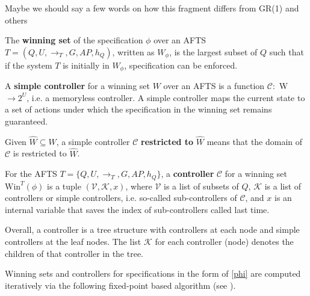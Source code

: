 {\color{blue}Maybe we should say a few words on how this fragment differs from GR(1) and others}

\begin{definition}
	The \textbf{winning set} of the specification $ \phi $ over an AFTS $ T = (Q, U, \rightarrow_T, G, AP, h_Q) $, written as $ W_{\phi} $, is the largest subset of $ Q $ such that if the system $ T $ is initially in $ W_{\phi} $, specification can be enforced.
\end{definition}

\begin{definition}
	A \textbf{simple controller} for a winning set $ W $ over an AFTS is a function $ \mathcal{C}: $ W $ \rightarrow 2^U $, i.e. a memoryless controller. A simple controller maps the current state to a set of actions under which the specification in the winning set remains guaranteed.
	\label{def:simp}
\end{definition}

Given $\widehat{W} \subseteq W $, a simple controller $ \mathcal{C} $ \textbf{restricted to} $ \widehat{W} $ means that the domain of $ \mathcal{C} $ is restricted to $\widehat{W}$.

\begin{definition}
	For the AFTS $ T=\{Q,U,\rightarrow_T,G,AP,h_Q\} $, a \textbf{controller} $ \mathcal{C} $ for a winning set $ \text{Win}^T(\phi) $ is a tuple $ (\mathcal{V},\mathcal{K},x) $, where $ \mathcal{V} $ is a list of subsets of $ Q $, $ \mathcal{K} $ is a list of controllers or simple controllers, i.e. so-called sub-controllers of $ \mathcal{C} $, and $ x $ is an internal variable that saves the index of sub-controllers called last time.
	\label{def:cont}
\end{definition}
 
 Overall, a controller is a tree structure with controllers at each node and simple controllers at the leaf nodes. The list $\mathcal{K}$ for each controller (node) denotes the children of that controller in the tree.



{\color{purple} Winning sets and controllers} for specifications in the form of \eqref{phi} are computed iteratively via the following fixed-point based algorithm {\color{purple} (see \cite{Nilsson2017})}.

